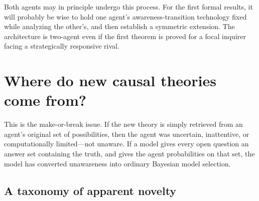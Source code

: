 \documentclass[11pt]{article}
\begin{document}
	\begin{center}
	\end{center}
	
	Both agents may in principle undergo this process.  For the first formal results, it will probably be wise to hold one agent's awareness-transition technology fixed while analyzing the other's, and then establish a symmetric extension.  The architecture is two-agent even if the first theorem is proved for a focal inquirer facing a strategically responsive rival.
	
	\section{Where do new causal theories come from?}
	
	This is the make-or-break issue.  If the new theory is simply retrieved from an agent's original set of possibilities, then the agent was uncertain, inattentive, or computationally limited---not unaware.  If a model gives every open question an answer set containing the truth, and gives the agent probabilities on that set, the model has converted unawareness into ordinary Bayesian model selection.
	
	\subsection{A taxonomy of apparent novelty}
	
\end{document}
